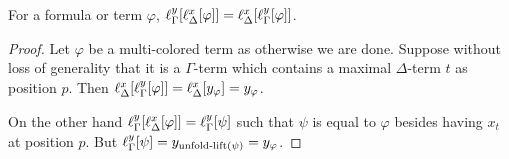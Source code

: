 \begin{lemma}

	For a formula or term $\varphi$,
	$ \ell_{\Gamma}^{y}[ \ell_{\Delta}^{x}[ \varphi]  ] =
	\ell_{\Delta}^{x}[ \ell_{\Gamma}^{y}[ \varphi ]  ]$.
	\label{lemma:lifting_order_not_relevant}
\end{lemma}
\begin{proof}
	Let $\varphi$ be a multi-colored term as otherwise we are done.
	Suppose without loss of generality that it is a $\Gamma$-term which contains a maximal $\Delta$-term $t$ as position $p$.
	Then $\ell_{\Delta}^{x}[ \ell_{\Gamma}^{y}[ \varphi ]  ]
	= \ell_{\Delta}^{x}[ y_\varphi ]
	= y_\varphi $.

	On the other hand
	$\ell_{\Gamma}^{y}[ \ell_{\Delta}^{x}[ \varphi]  ] = \ell_{\Gamma}^{y}[ \psi ]$ such that $\psi$ is equal to $\varphi$ besides having $x_t$ at position $p$.
	But $\ell_{\Gamma}^{y}[ \psi ] = y_{\operatorname{unfold-lift}(\psi)} = y_\varphi$.
\end{proof}


